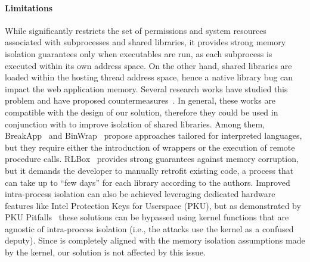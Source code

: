   \paragraph{Limitations}
  While \natisand significantly restricts the set of permissions and system
  resources associated with subprocesses and shared libraries, it
  provides strong memory isolation guarantees only when executables
  are run, as each subprocess is executed within its own address
  space. On the other hand, shared libraries are loaded within the
  hosting thread address space, hence a native library bug can impact
  the web application memory. Several research works have studied this
  problem and have proposed countermeasures~\cite{RLBox,
    kirth2022pkru, wu2012codejail, cali, vasilakis2018breakapp,
    binwrap}. In general, these works are compatible with the design
  of our solution, therefore they could be used in conjunction with
  \natisand to improve isolation of shared libraries. Among them,
  BreakApp~\cite{vasilakis2018breakapp} and BinWrap~\cite{binwrap}
  propose approaches tailored for interpreted languages, but they
  require either the introduction of wrappers or the execution of
  remote procedure calls. RLBox~\cite{RLBox} provides strong
  guarantees against memory corruption, but it demands the developer
  to manually retrofit existing code, a process that can take up to
  ``few days'' for each library according to the authors. Improved
  intra-process isolation can also be achieved leveraging dedicated
  hardware features like Intel Protection Keys for Userspace (PKU),
  but as demonstrated by PKU Pitfalls~\cite{pku-pitfalls} these
  solutions can be bypassed using kernel functions that are agnostic
  of intra-process isolation (i.e., the attacks use the kernel as a
  confused deputy). Since \natisand is completely aligned with the memory
  isolation assumptions made by the kernel, our solution is not
  affected by this issue.  




